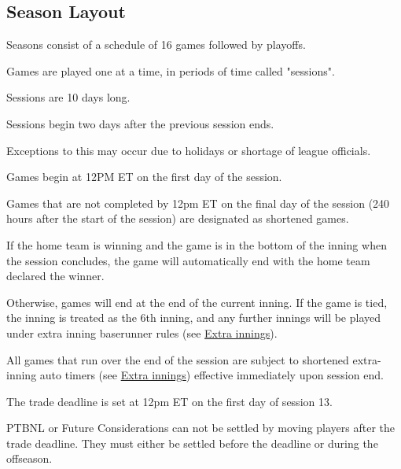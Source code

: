 
\subsection{Season Layout}
\begin{deepEnumerate}
	\item Seasons consist of a schedule of 16 games followed by playoffs.
	\item Games are played one at a time, in periods of time called "sessions".
	\begin{deepEnumerate}
		\item Sessions are 10 days long.
		\item Sessions begin two days after the previous session ends.
		\begin{deepEnumerate}
			\item Exceptions to this may occur due to holidays or shortage of league officials.
		\end{deepEnumerate}
		\item Games begin at 12PM ET on the first day of the session.
		\item Games that are not completed by 12pm ET on the final day of the session
		(240 hours after the start of the session)
		are designated as shortened games.
		\begin{deepEnumerate}
			\item If the home team is winning 
			and the game is in the bottom of the inning
			when the session concludes,
			the game will automatically end with the home team declared the winner.
			\item Otherwise, games will end at the end of the current inning.
			If the game is tied, the inning is treated as the 6th inning,
			and any further innings will be played under extra inning baserunner rules
			(see \hyperref[sec:extra innings]{Extra innings}).
			\item All games that run over the end of the session 
			are subject to shortened extra-inning auto timers
			(see \hyperref[sec:extra innings]{Extra innings}) 
			effective immediately upon session end.
		\end{deepEnumerate}
		\item The trade deadline is set at 12pm ET on the first day of session 13.
		\begin{deepEnumerate}
			\item PTBNL or Future Considerations can not be settled by moving players after the trade deadline.
			 They must either be settled before the deadline or during the offseason.

\end{deepEnumerate}
\end{deepEnumerate}
\end{deepEnumerate}
